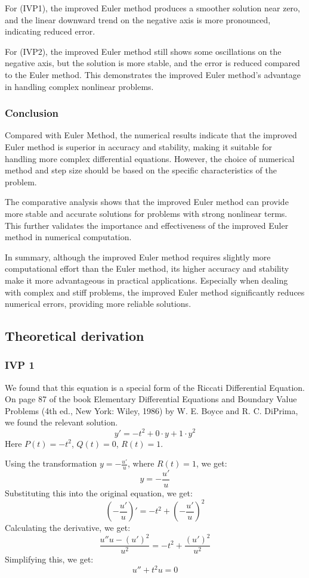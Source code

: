\documentclass{article}
\begin{document}
For (IVP1), the improved Euler method produces a smoother solution near zero, and the linear downward trend on the negative axis is more pronounced, indicating reduced error.

For (IVP2), the improved Euler method still shows some oscillations on the negative axis, but the solution is more stable, and the error is reduced compared to the Euler method. This demonstrates the improved Euler method's advantage in handling complex nonlinear problems.

\subsubsection{Conclusion}
Compared with Euler Method, the numerical results indicate that the improved Euler method is superior in accuracy and stability, making it suitable for handling more complex differential equations. However, the choice of numerical method and step size should be based on the specific characteristics of the problem.

The comparative analysis shows that the improved Euler method can provide more stable and accurate solutions for problems with strong nonlinear terms. This further validates the importance and effectiveness of the improved Euler method in numerical computation.

In summary, although the improved Euler method requires slightly more computational effort than the Euler method, its higher accuracy and stability make it more advantageous in practical applications. Especially when dealing with complex and stiff problems, the improved Euler method significantly reduces numerical errors, providing more reliable solutions.
\subsection{Theoretical derivation}
\subsubsection{IVP 1}
We found that this equation is a special form of the Riccati Differential Equation. On page 87 of the book Elementary Differential Equations and Boundary Value Problems (4th ed., New York: Wiley, 1986) by W. E. Boyce and R. C. DiPrima, we found the relevant solution.
\[
y' = -t^2 + 0 \cdot y + 1 \cdot y^2
\]
Here \( P(t) = -t^2 \), \( Q(t) = 0 \), \( R(t) = 1 \).

Using the transformation \( y = -\frac{u'}{u} \), where \( R(t) = 1 \), we get:
\[
y = -\frac{u'}{u}
\]
Substituting this into the original equation, we get:
\[
\left( -\frac{u'}{u} \right)' = -t^2 + \left( -\frac{u'}{u} \right)^2
\]
Calculating the derivative, we get:
\[
\frac{u''u - (u')^2}{u^2} = -t^2 + \frac{(u')^2}{u^2}
\]
Simplifying this, we get:
\[
u'' + t^2 u = 0
\]
\end{document}

